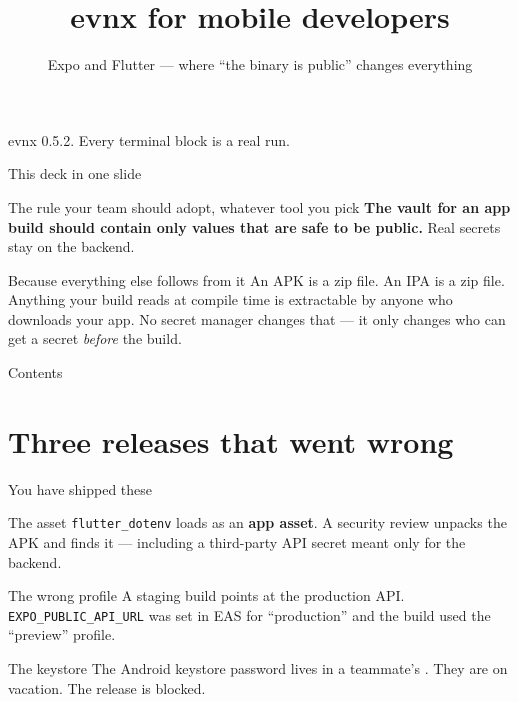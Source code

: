 \documentclass[aspectratio=169,10pt]{beamer}
\title{evnx for mobile developers}
\subtitle{Expo and Flutter --- where ``the binary is public'' changes everything}
\date{}
\begin{document}
\begin{frame}[plain]
  \titlepage
  \begin{center}\footnotesize
  \textcolor{evnxMuted}{evnx 0.5.2. Every terminal block is a real run.}
  \end{center}
\end{frame}

\begin{frame}{This deck in one slide}
  \begin{block}{The rule your team should adopt, whatever tool you pick}
    \textbf{The vault for an app build should contain only values that are
    safe to be public.} Real secrets stay on the backend.
  \end{block}

  \vspace{0.7em}
  \begin{block}{Because everything else follows from it}
    An APK is a zip file. An IPA is a zip file. Anything your build reads at
    compile time is extractable by anyone who downloads your app. No secret
    manager changes that --- it only changes who can get a secret
    \emph{before} the build.
  \end{block}

\end{frame}

\begin{frame}{Contents}\tableofcontents[hideallsubsections]\end{frame}

\section{Three releases that went wrong}

\begin{frame}{You have shipped these}
  \small
  \begin{block}{The asset}
    \texttt{flutter\_dotenv} loads  as an \textbf{app asset}. A
    security review unpacks the APK and finds it --- including a third-party
    API secret meant only for the backend.
  \end{block}

  \begin{block}{The wrong profile}
    A staging build points at the production API.
    \texttt{EXPO\_PUBLIC\_API\_URL} was set in EAS for ``production'' and the
    build used the ``preview'' profile.
  \end{block}

  \begin{block}{The keystore}
    The Android keystore password lives in a teammate's
    . They are on vacation.
    The release is blocked.
  \end{block}
\end{frame}
\end{document}
